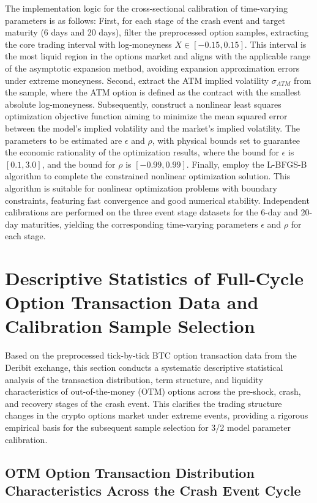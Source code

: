 The implementation logic for the cross-sectional calibration of time-varying parameters is as follows: First, for each stage of the crash event and target maturity (6 days and 20 days), filter the preprocessed option samples, extracting the core trading interval with log-moneyness $X \in [-0.15, 0.15]$. This interval is the most liquid region in the options market and aligns with the applicable range of the asymptotic expansion method, avoiding expansion approximation errors under extreme moneyness. Second, extract the ATM implied volatility $\sigma_{ATM}$ from the sample, where the ATM option is defined as the contract with the smallest absolute log-moneyness. Subsequently, construct a nonlinear least squares optimization objective function aiming to minimize the mean squared error between the model's implied volatility and the market's implied volatility. The parameters to be estimated are $\epsilon$ and $\rho$, with physical bounds set to guarantee the economic rationality of the optimization results, where the bound for $\epsilon$ is $[0.1, 3.0]$, and the bound for $\rho$ is $[-0.99, 0.99]$. Finally, employ the L-BFGS-B algorithm to complete the constrained nonlinear optimization solution. This algorithm is suitable for nonlinear optimization problems with boundary constraints, featuring fast convergence and good numerical stability. Independent calibrations are performed on the three event stage datasets for the 6-day and 20-day maturities, yielding the corresponding time-varying parameters $\epsilon$ and $\rho$ for each stage.

\section{Descriptive Statistics of Full-Cycle Option Transaction Data and Calibration Sample Selection}

Based on the preprocessed tick-by-tick BTC option transaction data from the Deribit exchange, this section conducts a systematic descriptive statistical analysis of the transaction distribution, term structure, and liquidity characteristics of out-of-the-money (OTM) options across the pre-shock, crash, and recovery stages of the crash event. This clarifies the trading structure changes in the crypto options market under extreme events, providing a rigorous empirical basis for the subsequent sample selection for 3/2 model parameter calibration.

\subsection{OTM Option Transaction Distribution Characteristics Across the Crash Event Cycle}

